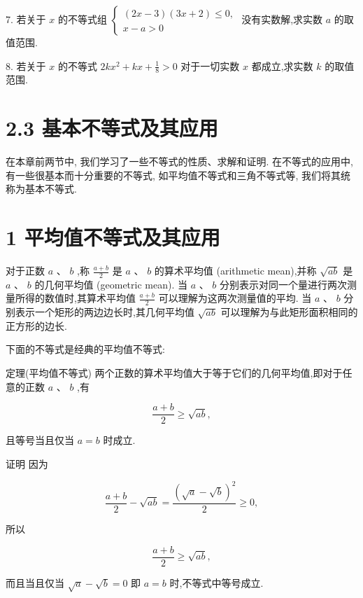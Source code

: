 \documentclass[10pt]{article}
\begin{document}
7. 若关于 \(x\) 的不等式组 \(\left\{  \begin{array}{l} \left( {{2x} - 3}\right) \left( {{3x} + 2}\right)  \leq  0, \\  x - a > 0 \end{array}\right.\) 没有实数解,求实数 \(a\) 的取值范围.

8. 若关于 \(x\) 的不等式 \({2k}{x}^{2} + {kx} + \frac{1}{8} > 0\) 对于一切实数 \(x\) 都成立,求实数 \(k\) 的取值范围.



\section*{2.3 基本不等式及其应用}

在本章前两节中, 我们学习了一些不等式的性质、求解和证明. 在不等式的应用中, 有一些很基本而十分重要的不等式, 如平均值不等式和三角不等式等, 我们将其统称为基本不等式.

\section*{1 平均值不等式及其应用}

对于正数 \(a\text{ 、 }b\) ,称 \(\frac{a + b}{2}\) 是 \(a\text{ 、 }b\) 的算术平均值 (arithmetic mean),并称 \(\sqrt{ab}\) 是 \(a\text{ 、 }b\) 的几何平均值 (geometric mean). 当 \(a\text{ 、 }b\) 分别表示对同一个量进行两次测量所得的数值时,其算术平均值 \(\frac{a + b}{2}\) 可以理解为这两次测量值的平均. 当 \(a\text{ 、 }b\) 分别表示一个矩形的两边边长时,其几何平均值 \(\sqrt{ab}\) 可以理解为与此矩形面积相同的正方形的边长.

下面的不等式是经典的平均值不等式:

定理(平均值不等式) 两个正数的算术平均值大于等于它们的几何平均值,即对于任意的正数 \(a\text{ 、 }b\) ,有

\[
\frac{a + b}{2} \geq  \sqrt{ab},
\]

且等号当且仅当 \(a = b\) 时成立.

证明 因为

\[
\frac{a + b}{2} - \sqrt{ab} = \frac{{\left( \sqrt{a} - \sqrt{b}\right) }^{2}}{2} \geq  0,
\]

所以

\[
\frac{a + b}{2} \geq  \sqrt{ab},
\]

而且当且仅当 \(\sqrt{a} - \sqrt{b} = 0\) 即 \(a = b\) 时,不等式中等号成立.

\section*{}
\end{document}
